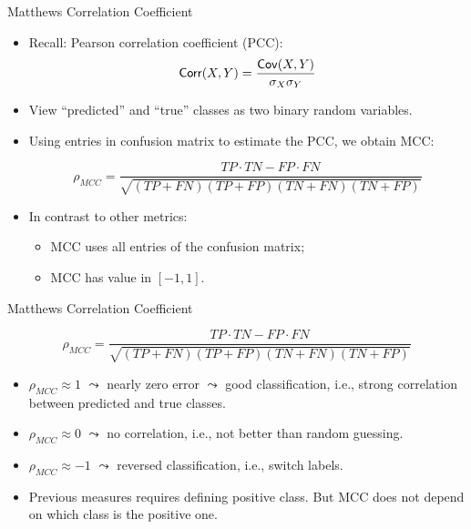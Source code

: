 \documentclass[11pt,compress,t,notes=noshow, xcolor=table]{beamer}
\begin{document}
\begin{frame}{Matthews Correlation Coefficient}

	\small{
    	\begin{itemize}
    
            \item Recall: Pearson correlation coefficient (PCC): 
                $$\mathsf{Corr}(X, Y) = \frac{\mathsf{Cov}(X, Y)}{\sigma_{X} \sigma_{Y}}$$
    		\item View ``predicted'' and ``true'' classes as two binary random variables.
      
            \item Using entries in confusion matrix to estimate the PCC, we obtain MCC:
    	
    		$$   \rho_{MCC} = \frac{TP\cdot TN - FP \cdot FN}{\sqrt{(TP+FN)(TP+FP)(TN+FN)(TN+FP)}}$$
    
            \item In contrast to other metrics: 
            \begin{itemize}
                \footnotesize
                \item MCC uses all entries of the confusion matrix;
                \item MCC has value in $[-1,1]$.
            \end{itemize}
    		
        \end{itemize}
    	
	}
\end{frame}

\begin{frame}{Matthews Correlation Coefficient}
    \small{
        $$   \rho_{MCC} = \frac{TP\cdot TN - FP \cdot FN}{\sqrt{(TP+FN)(TP+FP)(TN+FN)(TN+FP)}}$$

        \begin{itemize}
            \item $\rho_{MCC} \approx 1$ $\leadsto$ nearly zero error $\leadsto$ good classification, i.e., strong correlation between predicted and true classes.
            \vspace{10pt}
    	
            \item $\rho_{MCC} \approx 0$ $\leadsto$ no correlation, i.e., not better than random guessing.
            \vspace{10pt}
    	
            \item $\rho_{MCC} \approx -1$ $\leadsto$ reversed classification, i.e., switch labels.
            \vspace{10pt}
    
            \item Previous measures requires defining positive class. But MCC does not depend on which class is the positive one.
            
        \end{itemize}
         
    }
    
\end{frame}
\end{document}
